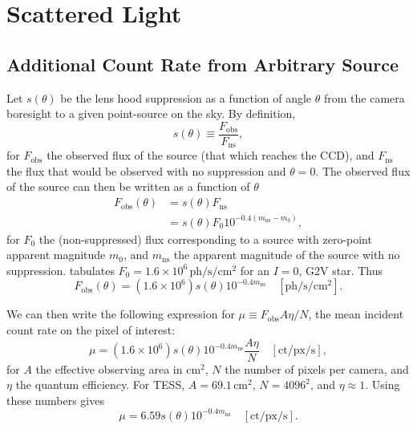 \section{Scattered Light}
\subsection{Additional Count Rate from Arbitrary Source}
Let $s(\theta)$ be the lens hood suppression as a function of angle $\theta$ 
from the camera boresight to a given point-source on the sky. By definition,
\begin{equation}
s(\theta) \equiv \frac{F_\mathrm{obs}}{F_\mathrm{ns}},
\end{equation}
for $F_\mathrm{obs}$ the observed flux of the source (that which reaches the 
CCD), and $F_\mathrm{ns}$ the flux that would be observed with no 
suppression and $\theta=0$.
The observed flux of the source can then be written as a function of $\theta$
\begin{align}
	F_\mathrm{obs}(\theta) &= s(\theta) F_\mathrm{ns}  \\
	&= s(\theta) F_0 10^{-0.4(m_\mathrm{ns} - m_0)} ,
\end{align}
for $F_0$ the (non-suppressed) flux corresponding to a source with zero-point 
apparent magnitude $m_0$, and $m_\mathrm{ns}$ the apparent magnitude of 
the source with no suppression.
\citet{winn_searchable_2013} tabulates $F_0 = 
1.6\times10^6\,\mathrm{ph/s/cm^2}$ 
for an $I=0$, G2V star.
Thus
\begin{equation}
F_\mathrm{obs}(\theta) = (1.6\times 10^6) s(\theta) 10^{-0.4 m_\mathrm{ns}} 
\quad \mathrm{[ph/s/cm^2]}.
\end{equation}

We can then write the following expression for $\mu\equiv F_\mathrm{obs} A \eta 
/ N$, the mean incident count rate on the pixel of interest:
\begin{equation}
\mu =  (1.6\times 10^6) s(\theta) 10^{-0.4 m_\mathrm{ns}} \frac{A 
\eta}{N} \quad \mathrm{[ct/px/s]},
\end{equation}
for $A$ the effective observing area in $\mathrm{cm^2}$, $N$ the 
number of pixels per camera, and $\eta$ the quantum efficiency.
For TESS, $A=69.1\,\mathrm{cm^2}$, $N=4096^2$, and $\eta\approx 1$. Using
these numbers gives
\begin{equation}
\mu = 6.59  s(\theta) 10^{-0.4 m_\mathrm{ns}}\quad 
\mathrm{[ct/px/s]}.
\label{eq:mean_added_flux}
\end{equation}

